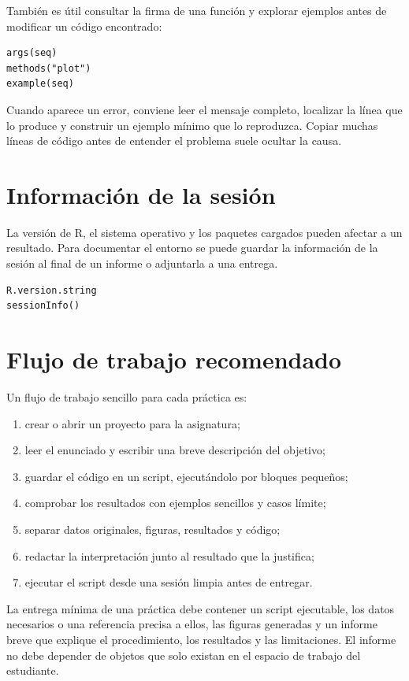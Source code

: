 \documentclass[11pt,a4paper,oneside]{book}
\begin{document}
También es útil consultar la firma de una función y explorar ejemplos antes de modificar un código encontrado:

\begin{lstlisting}[style=rstyle]
args(seq)
methods("plot")
example(seq)
\end{lstlisting}

Cuando aparece un error, conviene leer el mensaje completo, localizar la línea que lo produce y construir un ejemplo mínimo que lo reproduzca. Copiar muchas líneas de código antes de entender el problema suele ocultar la causa.

\section{Información de la sesión}
La versión de R, el sistema operativo y los paquetes cargados pueden afectar a un resultado. Para documentar el entorno se puede guardar la información de la sesión al final de un informe o adjuntarla a una entrega.

\begin{lstlisting}[style=rstyle]
R.version.string
sessionInfo()
\end{lstlisting}

\section{Flujo de trabajo recomendado}
Un flujo de trabajo sencillo para cada práctica es:
\begin{enumerate}
  \item crear o abrir un proyecto para la asignatura;
  \item leer el enunciado y escribir una breve descripción del objetivo;
  \item guardar el código en un script, ejecutándolo por bloques pequeños;
  \item comprobar los resultados con ejemplos sencillos y casos límite;
  \item separar datos originales, figuras, resultados y código;
  \item redactar la interpretación junto al resultado que la justifica;
  \item ejecutar el script desde una sesión limpia antes de entregar.
\end{enumerate}

\begin{entrega}
La entrega mínima de una práctica debe contener un script ejecutable, los datos necesarios o una referencia precisa a ellos, las figuras generadas y un informe breve que explique el procedimiento, los resultados y las limitaciones. El informe no debe depender de objetos que solo existan en el espacio de trabajo del estudiante.
\end{entrega}
\end{document}
